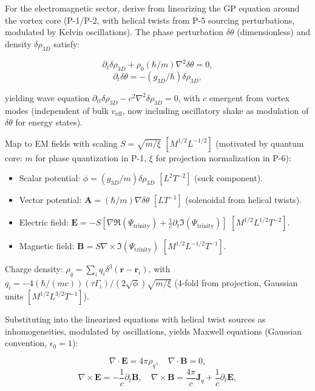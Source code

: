 For the electromagnetic sector, derive from linearizing the GP equation around the vortex core (P-1/P-2, with helical twists from P-5 sourcing perturbations, modulated by Kelvin oscillations). The phase perturbation $\delta \theta$ (dimensionless) and density $\delta \rho_{3D}$ satisfy:

\begin{equation}
\partial_t \delta \rho_{3D} + \rho_0 (\hbar / m) \nabla^2 \delta \theta = 0,
\end{equation}
\begin{equation}
\partial_t \delta \theta = - (g_{3D} / \hbar) \delta \rho_{3D},
\end{equation}

yielding wave equation $\partial_{tt} \delta \rho_{3D} - c^2 \nabla^2 \delta \rho_{3D} = 0$, with $c$ emergent from vortex modes (independent of bulk $v_{\text{eff}}$, now including oscillatory shake as modulation of $\delta \theta$ for energy states).

Map to EM fields with scaling $S = \sqrt{m / \xi}$ $[M^{1/2} L^{-1/2}]$ (motivated by quantum core: $m$ for phase quantization in P-1, $\xi$ for projection normalization in P-6):

\begin{itemize}
\item Scalar potential: $\phi = (g_{3D} / m) \delta \rho_{3D}$ $[L^2 T^{-2}]$ (suck component).
\item Vector potential: $\mathbf{A} = (\hbar / m) \nabla \delta \theta$ $[L T^{-1}]$ (solenoidal from helical twists).
\item Electric field: $\mathbf{E} = -S \left[ \nabla \Re(\Psi_{\text{trinity}}) + \frac{1}{c} \partial_t \Im(\Psi_{\text{trinity}}) \right]$ $[M^{1/2} L^{1/2} T^{-2}]$.
\item Magnetic field: $\mathbf{B} = S \nabla \times \Im(\Psi_{\text{trinity}})$ $[M^{1/2} L^{-1/2} T^{-1}]$.
\end{itemize}

Charge density: $\rho_q = \sum_i q_i \delta^3(\mathbf{r} - \mathbf{r}_i)$, with $q_i = -4 (\hbar / (m c)) (\tau \Gamma_i) / (2 \sqrt{\phi}) \sqrt{m / \xi}$ (4-fold from projection, Gaussian units $[M^{1/2} L^{3/2} T^{-1}]$).

Substituting into the linearized equations with helical twist sources as inhomogeneities, modulated by oscillations, yields Maxwell equations (Gaussian convention, $\epsilon_0 = 1$):

\begin{equation}
\nabla \cdot \mathbf{E} = 4\pi \rho_q, \quad \nabla \cdot \mathbf{B} = 0,
\end{equation}
\begin{equation}
\nabla \times \mathbf{E} = -\frac{1}{c} \partial_t \mathbf{B}, \quad \nabla \times \mathbf{B} = \frac{4\pi}{c} \mathbf{J}_q + \frac{1}{c} \partial_t \mathbf{E},
\end{equation}

